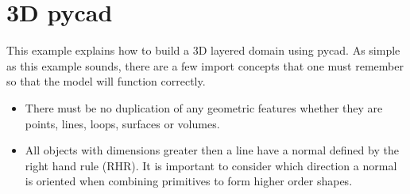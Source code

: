 
%
%
%

\section{3D pycad}
This example explains how to build a 3D layered domain using pycad. As
simple as this example sounds, there are a few import concepts that one must
remember  so that the model will function correctly.
\begin{itemize}
  \item There must be no duplication of any geometric features whether they are
  points, lines, loops, surfaces or volumes.
  \item All objects with dimensions greater then a line have a normal defined by
  the right hand rule (RHR). It is important to consider which direction a
  normal is oriented when combining primitives to form higher order shapes.
\end{itemize}


